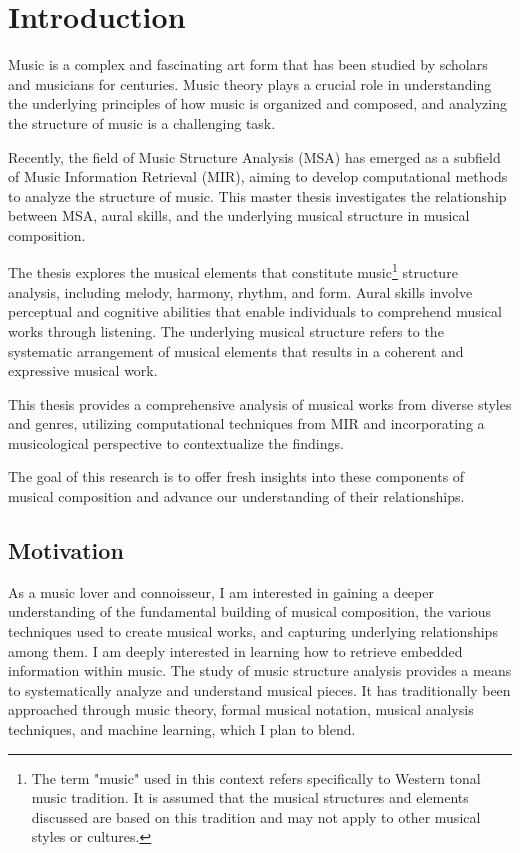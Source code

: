 \normallinespacing

\chapter{Introduction}

Music is a complex and fascinating art form that has been studied by scholars and musicians for centuries. Music theory plays a crucial role in understanding the underlying principles of how music is organized and composed, and analyzing the structure of music is a challenging task. 

Recently, the field of Music Structure Analysis (MSA) has emerged as a subfield of Music Information Retrieval (MIR), aiming to develop computational methods to analyze the structure of music. This master thesis investigates the relationship between MSA, aural skills, and the underlying musical structure in musical composition. 

The thesis explores the musical elements that constitute music\footnote{The term "music" used in this context refers specifically to Western tonal music tradition. It is assumed that the musical structures and elements discussed are based on this tradition and may not apply to other musical styles or cultures.} structure analysis, including melody, harmony, rhythm, and form. Aural skills involve perceptual and cognitive abilities that enable individuals to comprehend musical works through listening. The underlying musical structure refers to the systematic arrangement of musical elements that results in a coherent and expressive musical work. 

This thesis provides a comprehensive analysis of musical works from diverse styles and genres, utilizing computational techniques from MIR and incorporating a musicological perspective to contextualize the findings. 

The goal of this research is to offer fresh insights into these components of musical composition and advance our understanding of their relationships.

\section{Motivation}

As a music lover and connoisseur, I am interested in gaining a deeper understanding of the fundamental building of musical composition, the various techniques used to create musical works, and capturing underlying relationships among them. I am deeply interested in learning how to retrieve embedded information within music. The study of music structure analysis provides a means to systematically analyze and understand musical pieces. It has traditionally been approached through music theory, formal musical notation, musical analysis techniques, and machine learning, which I plan to blend.

